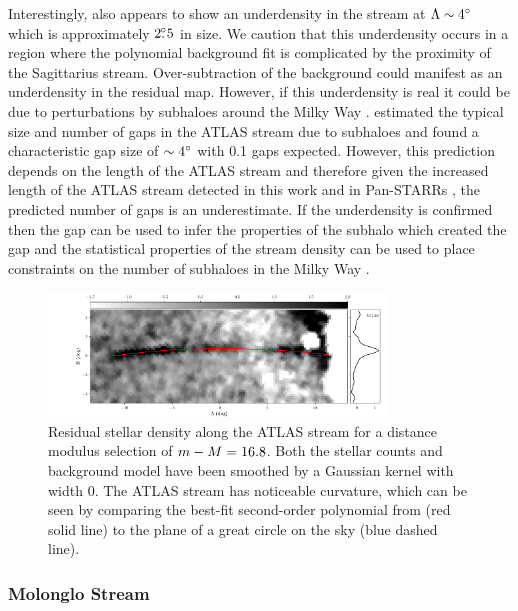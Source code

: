 \documentclass[twocolumn]{aastex61}
\begin{document}
Interestingly,  also appears to show an underdensity in the stream at $\Lambda \sim 4{}^{\circ}$ which is approximately $2\mbox{$.\!\!^\circ$}5$ in size. 
We caution that this underdensity occurs in a region where the polynomial background fit is complicated by the proximity of the Sagittarius stream. 
Over-subtraction of the background could manifest as an underdensity in the residual map.
However, if this underdensity is real it could be due to perturbations by subhaloes around the Milky Way \citep[e.g.][]{Ibata:2002,Johnston:2002}. \citet{Erkal:2016b} estimated the typical size and number of gaps in the ATLAS stream due to subhaloes and found a characteristic gap size of $\sim 4 {}^{\circ}$ with 0.1 gaps expected. However, this prediction depends on the length of the ATLAS stream and therefore given the increased length of the ATLAS stream detected in this work and in Pan-STARRs \citep{Bernard:2016}, the predicted number of gaps is an underestimate. If the underdensity is confirmed then the gap can be used to infer the properties of the subhalo which created the gap \citep[][]{Erkal:2015b} and the statistical properties of the stream density can be used to place constraints on the number of subhaloes in the Milky Way \citep[][]{Bovy:2017}.

\begin{figure}[htb!]
\centering
\includegraphics[width=0.8\textwidth]{ATLAS_zoom_m16p8_v17p2}
\caption{Residual stellar density along the ATLAS stream for a distance modulus selection of $m - M = 16.8$. Both the stellar counts and background model have been smoothed by a Gaussian kernel with width 0. The ATLAS stream has noticeable curvature, which can be seen by comparing the best-fit second-order polynomial from  (red solid line) to the plane of a great circle on the sky (blue dashed line).}
\label{fig:atlas}
\end{figure}


\subsubsection{Molonglo Stream}
\label{sec:molonglo}
\end{document}
